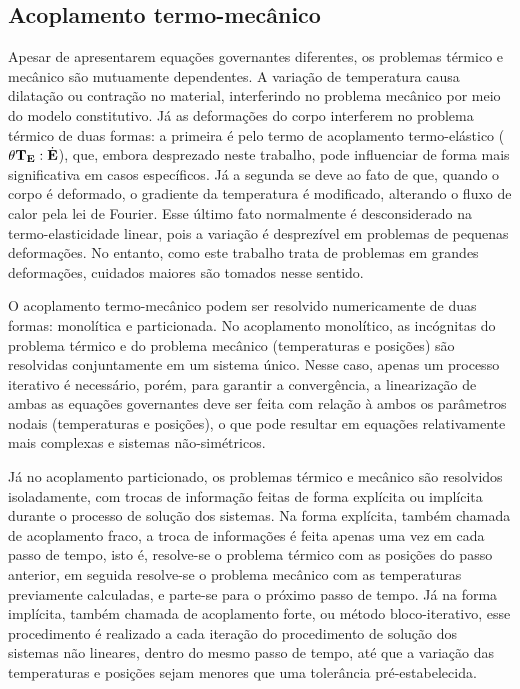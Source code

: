 \documentclass[Tese.tex]{subfiles}
\begin{document}
\subsection{Acoplamento termo-mecânico}\label{subsec:acoplamento}

Apesar de apresentarem equações governantes diferentes, os problemas térmico e mecânico são mutuamente dependentes. A variação de temperatura causa dilatação ou contração no material, interferindo no problema mecânico por meio do modelo constitutivo. Já as deformações do corpo interferem no problema térmico de duas formas: a primeira é pelo termo de acoplamento termo-elástico ($\theta\mathbf{T}_{\mathbf{E}}:\dot{\mathbf{E}}$), que, embora desprezado neste trabalho, pode influenciar de forma mais significativa em casos específicos. Já a segunda se deve ao fato de que, quando o corpo é deformado, o gradiente da temperatura é modificado, alterando o fluxo de calor pela lei de Fourier. Esse último fato normalmente é desconsiderado na termo-elasticidade linear, pois a variação é desprezível em problemas de pequenas deformações. No entanto, como este trabalho trata de problemas em grandes deformações, cuidados maiores são tomados nesse sentido.

O acoplamento termo-mecânico podem ser resolvido numericamente de duas formas: monolítica e particionada. No acoplamento monolítico, as incógnitas do problema térmico e do problema mecânico (temperaturas e posições) são resolvidas conjuntamente em um sistema único. Nesse caso, apenas um processo iterativo é necessário, porém, para garantir a convergência, a linearização de ambas as equações governantes deve ser feita com relação à ambos os parâmetros nodais (temperaturas e posições), o que pode resultar em equações relativamente mais complexas e sistemas não-simétricos. 

Já no acoplamento particionado, os problemas térmico e mecânico são resolvidos isoladamente, com trocas de informação feitas de forma explícita ou implícita durante o processo de solução dos sistemas. Na forma explícita, também chamada de acoplamento fraco, a troca de informações é feita apenas uma vez em cada passo de tempo, isto é, resolve-se o problema térmico com as posições do passo anterior, em seguida resolve-se o problema mecânico com as temperaturas previamente calculadas, e parte-se para o próximo passo de tempo. Já na forma implícita, também chamada de acoplamento forte, ou método bloco-iterativo, esse procedimento é realizado a cada iteração do procedimento de solução dos sistemas não lineares, dentro do mesmo passo de tempo, até que a variação das temperaturas e posições sejam menores que uma tolerância pré-estabelecida.
\end{document}
